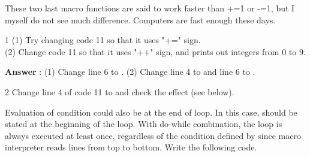These two last macro functions are said to work faster than +=1 or -=1, but I myself do not see much difference. Computers are fast enough these days.

\begin{indentexercise}
{1}
(1) Try changing code 11 so that it uses "+=" sign.\\
(2) Change code 11 so that it uses "++" sign, and prints out integers from 0 to 9.\\

\item \textbf{Answer} : (1) Change line 6 to . (2) Change line 4 to  and line 6 to .

\end{indentexercise}

\begin{indentexercise}
{2}
Change line 4 of code 11 to  and check the effect (see below).

\end{indentexercise}

Evaluation of  condition could also be at the end of loop. In this case,  should be stated at the beginning of the loop. With do-while combination, the loop is always executed at least once, regardless of the condition defined by  since macro interpreter reads lines from top to bottom. Write the following code.